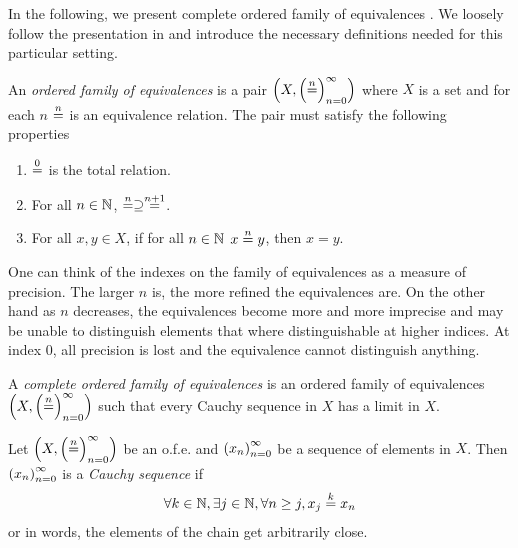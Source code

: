 \begin{jversion}
In the following, we present complete ordered family of equivalences \citep{di_gianantonio_2002}.
We loosely follow the presentation in \citet{birkedal_taste_2014} and introduce the necessary definitions needed for this particular setting.
\begin{definition}
An \emph{ordered family of equivalences} is a pair $\cofe{X}$ where $X$ is a set and for each $n$ $\nequal$ is an equivalence relation.
The pair must satisfy the following properties
\begin{enumerate}
\item $\nequal[0]$ is the total relation.
\item For all $n \in \nats$, $\nequal[n] \supseteq \nequal[n+1]$.
\item For all $x,y \in X$,  if for all $n \in \nats$ $x \nequal y$, then $x = y$.
\end{enumerate}
\end{definition}
\noindent One can think of the indexes on the family of equivalences as a measure of precision.
The larger $n$ is, the more refined the equivalences are.
On the other hand as $n$ decreases, the equivalences become more and more imprecise and may be unable to distinguish elements that where distinguishable at higher indices.
At index 0, all precision is lost and the equivalence cannot distinguish anything.
\begin{definition}
  \label{def:cauchy-sequence}
  A \emph{complete ordered family of equivalences} is an ordered family of equivalences
  $\cofe{X}$ such that every Cauchy sequence in $X$ has a limit
  in $X$.

  Let $\cofe{X}$ be an o.f.e. and $\seq{x}$ be a sequence of
  elements in $X$. Then $\seq{x}$ is a \emph{Cauchy sequence} if
  \begin{align*}
    \forall k \in \nats, \exists j \in \nats, \forall n \geq j, x_j \nequal[k] x_n
  \end{align*}
  or in words, the elements of the chain get arbitrarily close.


\end{definition}
\end{jversion}
